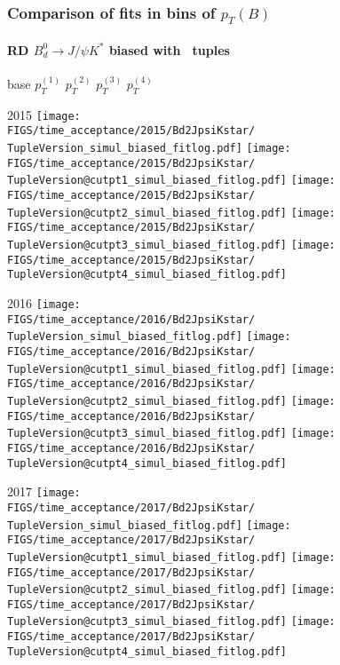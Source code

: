 
\begin{frame} %
\frametitle{Comparison of fits in bins of $p_T(B)$}
\framesubtitle{RD $B_d^0\rightarrow J/\psi K^*$ biased with \TupleVersion\, tuples}

  \phantom{2020} base \hspace*{1.5cm} $p_T^{(1)}$ \hspace*{1.5cm} $p_T^{(2)}$ \hspace*{1.5cm} $p_T^{(3)}$ \hspace*{1.5cm} $p_T^{(4)}$

  2015
  \texttt{[image: \\FIGS/time\_acceptance/2015/Bd2JpsiKstar/\\TupleVersion\_simul\_biased\_fitlog.pdf]}
  \texttt{[image: \\FIGS/time\_acceptance/2015/Bd2JpsiKstar/\\TupleVersion@cutpt1\_simul\_biased\_fitlog.pdf]}
  \texttt{[image: \\FIGS/time\_acceptance/2015/Bd2JpsiKstar/\\TupleVersion@cutpt2\_simul\_biased\_fitlog.pdf]}
  \texttt{[image: \\FIGS/time\_acceptance/2015/Bd2JpsiKstar/\\TupleVersion@cutpt3\_simul\_biased\_fitlog.pdf]}
  \texttt{[image: \\FIGS/time\_acceptance/2015/Bd2JpsiKstar/\\TupleVersion@cutpt4\_simul\_biased\_fitlog.pdf]}
  \vspace*{2mm}

  2016
  \texttt{[image: \\FIGS/time\_acceptance/2016/Bd2JpsiKstar/\\TupleVersion\_simul\_biased\_fitlog.pdf]}
  \texttt{[image: \\FIGS/time\_acceptance/2016/Bd2JpsiKstar/\\TupleVersion@cutpt1\_simul\_biased\_fitlog.pdf]}
  \texttt{[image: \\FIGS/time\_acceptance/2016/Bd2JpsiKstar/\\TupleVersion@cutpt2\_simul\_biased\_fitlog.pdf]}
  \texttt{[image: \\FIGS/time\_acceptance/2016/Bd2JpsiKstar/\\TupleVersion@cutpt3\_simul\_biased\_fitlog.pdf]}
  \texttt{[image: \\FIGS/time\_acceptance/2016/Bd2JpsiKstar/\\TupleVersion@cutpt4\_simul\_biased\_fitlog.pdf]}
  \vspace*{2mm}

  2017
  \texttt{[image: \\FIGS/time\_acceptance/2017/Bd2JpsiKstar/\\TupleVersion\_simul\_biased\_fitlog.pdf]}
  \texttt{[image: \\FIGS/time\_acceptance/2017/Bd2JpsiKstar/\\TupleVersion@cutpt1\_simul\_biased\_fitlog.pdf]}
  \texttt{[image: \\FIGS/time\_acceptance/2017/Bd2JpsiKstar/\\TupleVersion@cutpt2\_simul\_biased\_fitlog.pdf]}
  \texttt{[image: \\FIGS/time\_acceptance/2017/Bd2JpsiKstar/\\TupleVersion@cutpt3\_simul\_biased\_fitlog.pdf]}
  \texttt{[image: \\FIGS/time\_acceptance/2017/Bd2JpsiKstar/\\TupleVersion@cutpt4\_simul\_biased\_fitlog.pdf]}
  \vspace*{2mm}


\end{frame}
